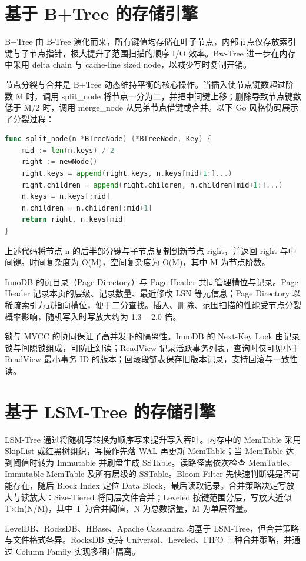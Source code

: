 \chapter{基于 B+Tree 的存储引擎}
B+Tree 由 B-Tree 演化而来，所有键值均存储在叶子节点，内部节点仅存放索引键与子节点指针，极大提升了范围扫描的顺序 I/O 效率。Bw-Tree 进一步在内存中采用 delta chain 与 cache-line sized node，以减少写时复制开销。\par
节点分裂与合并是 B+Tree 动态维持平衡的核心操作。当插入使节点键数超过阶数 M 时，调用 split\_{}node 将节点一分为二，并把中间键上移；删除导致节点键数低于 M/2 时，调用 merge\_{}node 从兄弟节点借键或合并。以下 Go 风格伪码展示了分裂过程：\par
\begin{lstlisting}[language=go]
func split_node(n *BTreeNode) (*BTreeNode, Key) {
    mid := len(n.keys) / 2
    right := newNode()
    right.keys = append(right.keys, n.keys[mid+1:]...)
    right.children = append(right.children, n.children[mid+1:]...)
    n.keys = n.keys[:mid]
    n.children = n.children[:mid+1]
    return right, n.keys[mid]
}
\end{lstlisting}
上述代码将节点 n 的后半部分键与子节点复制到新节点 right，并返回 right 与中间键。时间复杂度为 O(M)，空间复杂度为 O(M)，其中 M 为节点阶数。\par
InnoDB 的页目录（Page Directory）与 Page Header 共同管理槽位与记录。Page Header 记录本页的层级、记录数量、最近修改 LSN 等元信息；Page Directory 以稀疏索引方式指向槽位，便于二分查找。插入、删除、范围扫描的性能受节点分裂概率影响，随机写入时写放大约为 1.3 – 2.0 倍。\par
锁与 MVCC 的协同保证了高并发下的隔离性。InnoDB 的 Next-Key Lock 由记录锁与间隙锁组成，可防止幻读；ReadView 记录活跃事务列表，查询时仅可见小于 ReadView 最小事务 ID 的版本；回滚段链表保存旧版本记录，支持回滚与一致性读。\par
\chapter{基于 LSM-Tree 的存储引擎}
LSM-Tree 通过将随机写转换为顺序写来提升写入吞吐。内存中的 MemTable 采用 SkipList 或红黑树组织，写操作先落 WAL 再更新 MemTable；当 MemTable 达到阈值时转为 Immutable 并刷盘生成 SSTable。读路径需依次检查 MemTable、Immutable MemTable 及所有层级的 SSTable。Bloom Filter 先快速判断键是否可能存在，随后 Block Index 定位 Data Block，最后读取记录。合并策略决定写放大与读放大：Size-Tiered 将同层文件合并；Leveled 按键范围分层，写放大近似 T×ln(N/M)，其中 T 为合并阈值，N 为总数据量，M 为单层容量。\par
LevelDB、RocksDB、HBase、Apache Cassandra 均基于 LSM-Tree，但合并策略与文件格式各异。RocksDB 支持 Universal、Leveled、FIFO 三种合并策略，并通过 Column Family 实现多租户隔离。\par
